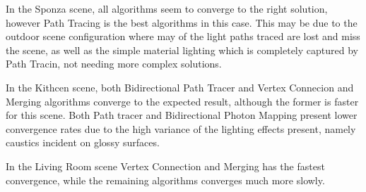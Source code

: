 In the Sponza scene, all algorithms seem to converge to the right solution, however Path Tracing is the best algorithms in this case. This may be due to the outdoor scene configuration where may of the light paths traced are lost and miss the scene, as well as the simple material lighting which is completely captured by Path Tracin, not needing more complex solutions.

In the Kithcen scene, both Bidirectional Path Tracer and Vertex Connecion and Merging algorithms converge to the expected result, although the former is faster for this scene. Both Path tracer and Bidirectional Photon Mapping present lower convergence rates due to the high variance of the lighting effects present, namely caustics incident on glossy surfaces.

In the Living Room scene Vertex Connection and Merging has the fastest convergence, while the remaining algorithms converges much more slowly.